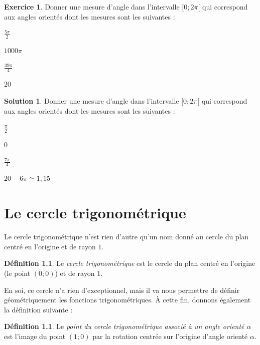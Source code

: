 \documentclass[a4paper,fontsize=13pt]{scrreprt}
\theoremstyle{plain}
\theoremstyle{definition}
\newtheorem{déf}[subsection]{Définition}
\newtheorem{exo}[subsection]{Exercice}
\newtheorem*{solu}{Solution}
\begin{document}
\begin{exo}
Donner une mesure d'angle dans l'intervalle $[0;2\pi[$ qui correspond aux angles orientés dont les mesures sont les suivantes :
\begin{enumerate}
\begin{multicols}{2}
\item $\frac{5\pi}{2}$
\item $1000 \pi$
\item $\frac{39\pi}{4}$
\item $20$
\end{multicols}
\end{enumerate}
\end{exo}
\begin{solu}
Donner une mesure d'angle dans l'intervalle $[0;2\pi[$ qui correspond aux angles orientés dont les mesures sont les suivantes :
\begin{enumerate}
\begin{multicols}{2}
\item $\frac{\pi}{2}$
\item $0$
\item $\frac{7\pi}{4}$
\item $20-6\pi \simeq 1,15$
\end{multicols}
\end{enumerate}
\end{solu}

\chapter{Le cercle trigonométrique}

Le cercle trigonométrique n'est rien d'autre qu'un nom donné au cercle du plan centré en l'origine et de rayon $1$.

\begin{déf}
Le \emph{cercle trigonométrique} est le cercle du plan centré en l'origine (le point $(0;0)$) et de rayon $1$.
\end{déf}

En soi, ce cercle n'a rien d'exceptionnel, mais il va nous permettre de définir géométriquement les fonctions trigonométriques. \`A cette fin, donnons également la définition suivante :

\begin{déf}
Le \emph{point du cercle trigonométrique associé à un angle orienté $\alpha$} est l'image du point $(1;0)$ par la rotation centrée sur l'origine d'angle orienté $\alpha$.
\end{déf}
\end{document}
